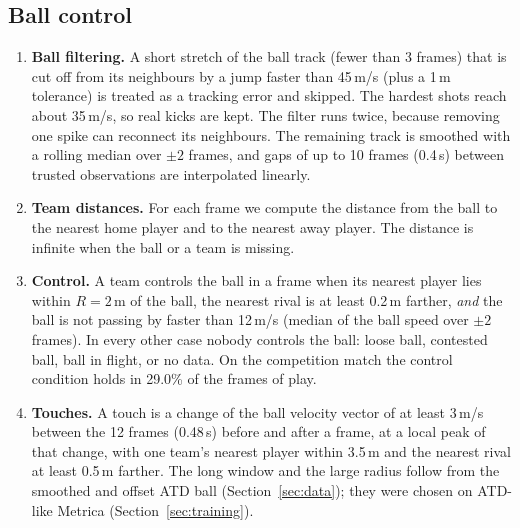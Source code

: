 \documentclass[11pt,a4paper]{article}
\begin{document}
\subsection{Ball control}
\label{sec:control}
\begin{enumerate}
  \item \textbf{Ball filtering.} A short stretch of the ball track (fewer than 3 frames) that is cut off from its
    neighbours by a jump faster than 45\,m/s (plus a 1\,m tolerance) is treated as a tracking error and skipped. The
    hardest shots reach about 35\,m/s, so real kicks are kept. The filter runs twice, because removing one spike can
    reconnect its neighbours. The remaining track is smoothed with a rolling median over $\pm2$ frames, and gaps of up
    to 10 frames (0.4\,s) between trusted observations are interpolated linearly.
  \item \textbf{Team distances.} For each frame we compute the distance from the ball to the nearest home player and
    to the nearest away player. The distance is infinite when the ball or a team is missing.
  \item \textbf{Control.} A team controls the ball in a frame when its nearest player lies within $R=2$\,m of the ball,
    the nearest rival is at least 0.2\,m farther, \emph{and} the ball is not passing by faster than 12\,m/s (median of
    the ball speed over $\pm2$ frames). In every other case nobody controls the ball: loose ball, contested ball, ball
    in flight, or no data. On the competition match the control condition holds in 29.0\% of the frames of play.
  \item \textbf{Touches.} A touch is a change of the ball velocity vector of at least 3\,m/s between the 12 frames
    (0.48\,s) before and after a frame, at a local peak of that change, with one team's nearest player within 3.5\,m
    and the nearest rival at least 0.5\,m farther. The long window and the large radius follow from the smoothed and
    offset ATD ball (Section~\ref{sec:data}); they were chosen on ATD-like Metrica (Section~\ref{sec:training}).
\end{enumerate}
\end{document}

